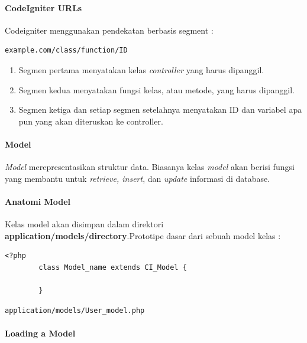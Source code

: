 \documentclass[a4paper,twoside]{article}
\begin{document}
\begin{enumerate}
		\paragraph{CodeIgniter URLs}
		\label{subs:urls}
		Codeigniter menggunakan pendekatan berbasis segment :
		\begin{lstlisting}[frame=single] 
		example.com/class/function/ID
		\end{lstlisting}
		
		\begin{enumerate}
			\item Segmen pertama menyatakan kelas \textit{controller} yang harus dipanggil.
			\item Segmen kedua menyatakan fungsi kelas, atau metode, yang harus dipanggil.
			\item Segmen ketiga dan setiap segmen setelahnya menyatakan ID dan variabel apa pun yang akan diteruskan ke controller.
		\end{enumerate}
		
		\paragraph{Model}
		\label{subs:model}
		\textit{Model} merepresentasikan struktur data. Biasanya kelas \textit {model} akan berisi fungsi yang membantu untuk \textit{retrieve, insert}, dan \textit{update} informasi di database.
		
		\paragraph{Anatomi Model}
		\label{sssec:model_1}
		Kelas model akan disimpan dalam direktori \textbf{application/models/directory}.Prototipe dasar dari sebuah model kelas :
		
		\begin{lstlisting}[frame=single]  
		<?php
		class Model_name extends CI_Model {
		
		}
		\end{lstlisting}
		
		\begin{lstlisting}[frame=single]  
		application/models/User_model.php
		\end{lstlisting}
		
		\paragraph{Loading a Model}
		\label{sssec:model_2}
		

\end{enumerate}
\end{document}
